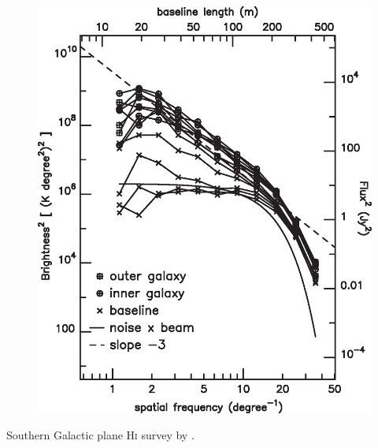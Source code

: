 \documentclass[12pt]{article}
\begin{document}
\begin{figure}[hb]
              \includegraphics[totalheight=80 mm]{img/Dickey2001_region2.eps}
            \end{figure}   
        \clearpage
        \begin{small}
        Southern Galactic plane H\textsc{i} survey by \cite{2001ApJ...561..264D}.
        \end{small}
\end{document}
